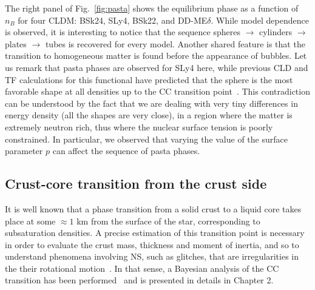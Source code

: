 The right panel of Fig.~\ref{fig:pasta} shows the equilibrium phase as a
function of $n_B$ for four CLDM: BSk24, SLy4, BSk22, and DD-ME$\delta$. While
model dependence is observed, it is interesting to notice that the 
sequence spheres $\rightarrow$ cylinders $\rightarrow$ plates $\rightarrow$ 
tubes is recovered for every model. Another shared feature is that the 
transition to homogeneous matter is found before the appearance of bubbles.
Let us remark that pasta phases are observed for SLy4 here, while previous CLD 
and TF calculations for this functional have predicted that the sphere is 
the most favorable shape at all densities up to the CC 
transition point~\cite{Douchin2000a, Vinas2017}. This contradiction can be
understood by the fact that we are dealing with very tiny differences in
energy density (all the shapes are very close), in a region where the matter is 
extremely neutron rich, thus
where the nuclear surface tension is poorly constrained. In particular, we 
observed that varying the value of the surface parameter $p$ can affect the 
sequence of pasta phases.

\subsection{Crust-core transition from the crust side}\label{subsec:ccfromc}

It is well known that a phase transition from a solid crust to a liquid core
takes place at some $\approx 1$ km from the surface of the star, corresponding 
to subsaturation densities. A precise estimation of this transition point is 
necessary in order to evaluate the crust mass, thickness and moment of inertia, 
and so to understand phenomena involving NS, such as glitches, that are 
irregularities in the their rotational motion~\cite{Espinoza2011}. In that 
sense, a Bayesian analysis of the CC transition has been 
performed~\cite{Carreau2019cc} and is presented in details in Chapter 2. 

